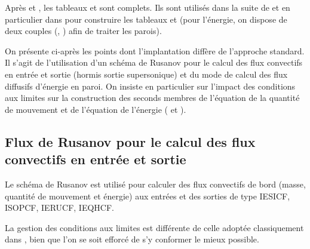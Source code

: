 Après  et , les tableaux  et 
sont complets. Ils sont utilisés dans la suite de  et en particulier
dans  pour construire les tableaux  et 
(pour l'énergie, on dispose de deux couples (, ) afin de
traiter les parois).

On présente ci-après les points dont l'implantation diffère
de l'approche standard. Il s'agit de
l'utilisation d'un schéma de Rusanov pour le calcul des flux convectifs
en entrée et sortie (hormis sortie supersonique)
et du mode de calcul des flux diffusifs d'énergie en paroi.
On insiste en particulier sur l'impact des conditions aux limites
sur la construction des seconds membres de l'équation de la quantité
de mouvement et de l'équation de l'énergie ( et ).

\subsection*{Flux de Rusanov pour le calcul des flux convectifs en entrée et sortie}

Le schéma de Rusanov est utilisé pour calculer des flux convectifs de bord
(masse, quantité de mouvement et énergie) aux entrées et des sorties
de type IESICF, ISOPCF, IERUCF, IEQHCF.

La gestion des conditions aux limites est différente de celle adoptée
classiquement dans \CS, bien que l'on se soit efforcé de s'y conformer le
mieux possible.

